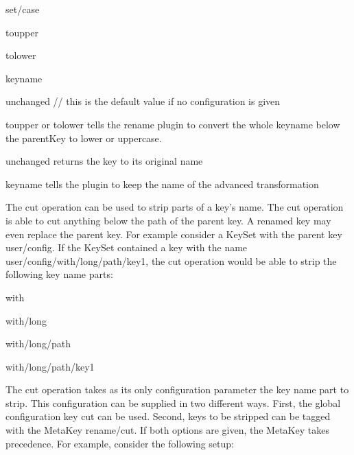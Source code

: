 {\ttfamily set/case}


\begin{DoxyItemize}
\item toupper
\item tolower
\item keyname
\item unchanged // this is the default value if no configuration is given
\end{DoxyItemize}

{\ttfamily toupper} or {\ttfamily tolower} tells the rename plugin to convert the whole keyname below the parent\+Key to lower or uppercase.

{\ttfamily unchanged} returns the key to its original name

{\ttfamily keyname} tells the plugin to keep the name of the advanced transformation

The cut operation can be used to strip parts of a key’s name. The cut operation is able to cut anything below the path of the parent key. A renamed key may even replace the parent key. For example consider a Key\+Set with the parent key {\ttfamily user/config}. If the Key\+Set contained a key with the name {\ttfamily user/config/with/long/path/key1}, the cut operation would be able to strip the following key name parts\+:


\begin{DoxyItemize}
\item with
\item with/long
\item with/long/path
\item with/long/path/key1
\end{DoxyItemize}

The cut operation takes as its only configuration parameter the key name part to strip. This configuration can be supplied in two different ways. First, the global configuration key {\ttfamily cut} can be used. Second, keys to be stripped can be tagged with the Meta\+Key {\ttfamily rename/cut}. If both options are given, the Meta\+Key takes precedence. For example, consider the following setup\+:


\begin{DoxyCode}{0}
\DoxyCodeLine{}
\end{DoxyCode}


